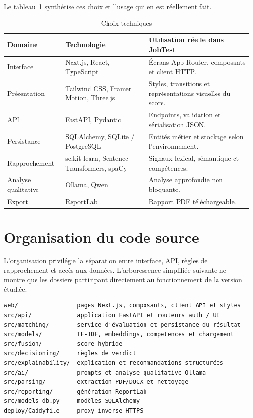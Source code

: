 Le tableau~\ref{tab:chap5-technology-summary} synthétise ces choix et l'usage qui en est réellement fait.

\begin{table}[H]
\centering
\small
\caption{Choix techniques}
\label{tab:chap5-technology-summary}
\begin{tabularx}{\textwidth}{|l|l|X|}
\hline
\textbf{Domaine} & \textbf{Technologie} & \textbf{Utilisation réelle dans JobTest}\\
\hline
Interface & Next.js, React, TypeScript & Écrans App Router, composants et client HTTP.\\
\hline
Présentation & Tailwind CSS, Framer Motion, Three.js & Styles, transitions et représentations visuelles du score.\\
\hline
API & FastAPI, Pydantic & Endpoints, validation et sérialisation JSON.\\
\hline
Persistance & SQLAlchemy, SQLite / PostgreSQL & Entités métier et stockage selon l'environnement.\\
\hline
Rapprochement & scikit-learn, Sentence-Transformers, spaCy & Signaux lexical, sémantique et compétences.\\
\hline
Analyse qualitative & Ollama, Qwen & Analyse approfondie non bloquante.\\
\hline
Export & ReportLab & Rapport PDF téléchargeable.\\
\hline
\end{tabularx}
\end{table}

\section{Organisation du code source}

L'organisation privilégie la séparation entre interface, API, règles de rapprochement et accès aux données. L'arborescence simplifiée suivante ne montre que les dossiers participant directement au fonctionnement de la version étudiée.

\begin{verbatim}
web/                 pages Next.js, composants, client API et styles
src/api/             application FastAPI et routeurs auth / UI
src/matching/        service d'évaluation et persistance du résultat
src/models/          TF-IDF, embeddings, compétences et chargement
src/fusion/          score hybride
src/decisioning/     règles de verdict
src/explainability/  explication et recommandations structurées
src/ai/              prompts et analyse qualitative Ollama
src/parsing/         extraction PDF/DOCX et nettoyage
src/reporting/       génération ReportLab
src/models_db.py     modèles SQLAlchemy
deploy/Caddyfile     proxy inverse HTTPS
\end{verbatim}

